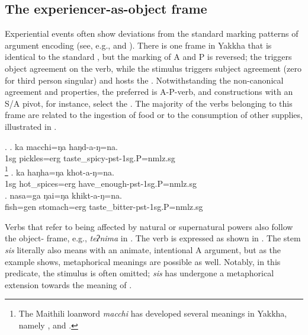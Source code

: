 \subsection{The experiencer-as-object frame}\label{tr-objex}


\noindent
Experiential events often show deviations from the standard marking patterns of argument encoding (see, e.g.,  \citealt{Bhaskararao2004_Nonnominative} and  \citealt{Malchukov2008Split}). There is one frame in Yakkha that is identical to the standard , but the marking of A and P is reversed;  the  triggers object agreement on the verb, while the stimulus triggers subject agreement (zero for third person singular) and hosts the   . Notwithstanding the non-canonical agreement and  properties, the preferred  is A-P-verb, and constructions with an S/A pivot, for instance, select the . The majority of the verbs belonging to this frame are related  to the ingestion of food or to the consumption of other supplies, illustrated in \Next.

\ex. \ag. ka macchi=ŋa haŋd-a-ŋ=na.\\
		{\sc 1sg} pickles{\sc =erg} taste\_spicy{\sc -pst-1sg.P=nmlz.sg}\\
		\footnote{The Maithili loanword \emph{macchi} has developed several meanings in Yakkha, namely ,  and .}
	\bg. ka haŋha=ŋa khot-a-ŋ=na.\\	
		{\sc 1sg} hot\_spices{\sc =erg} have\_enough{\sc -pst-1sg.P=nmlz.sg}\\
	\bg. nasa=ga ŋai=ŋa khikt-a-ŋ=na.\\ 
		fish{\sc =gen} stomach{\sc =erg} taste\_bitter{\sc -pst-1sg.P=nmlz.sg}\\
	
	
Verbs that refer to being affected by natural or supernatural powers also follow the object- frame, e.g., \emph{teʔnima}  in  \Next[a].  The verb  is expressed as shown in \Next[b]. The stem \emph{sis} literally also means  with an animate, intentional A argument, but as the example shows, metaphorical meanings are possible as well. Notably, in this predicate, the stimulus is often omitted; \emph{sis} has undergone a metaphorical extension towards the meaning of .


